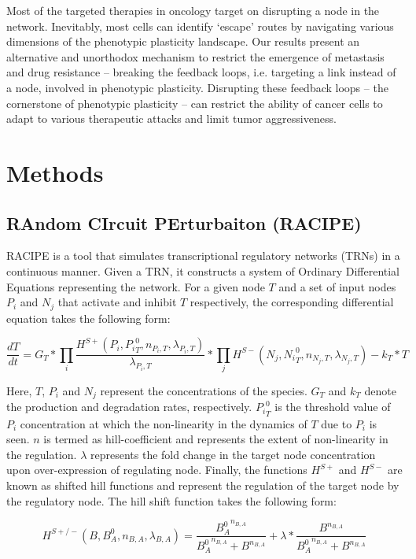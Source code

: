 \documentclass[preprint,review,12pt]{elsarticle}
\begin{document}
	Most of the targeted therapies in oncology target on disrupting a node in the network. Inevitably, most cells can identify ‘escape’ routes by navigating various dimensions of the phenotypic plasticity landscape. Our results present an alternative and unorthodox mechanism to restrict the emergence of metastasis and drug resistance -- breaking the feedback loops, i.e. targeting a link instead of a node, involved in phenotypic plasticity. Disrupting these feedback loops $–$ the cornerstone of phenotypic plasticity $–$ can restrict the ability of cancer cells to adapt to various therapeutic attacks and limit tumor aggressiveness.

	\newpage
	\section{Methods}
	\subsection{RAndom CIrcuit PErturbaiton (RACIPE)}
	RACIPE \cite{Huang2016,Huang2018} is a tool that simulates transcriptional regulatory networks (TRNs) in a continuous manner. Given a TRN, it constructs a system of Ordinary Differential Equations representing the network. \color{red}For a given node $T$ and a set of input nodes $P_i$ and $N_j$ that activate and inhibit $T$ respectively, the corresponding differential equation takes the following form:
	
	$$\frac{dT}{dt} = G_T * \prod_i \frac{H^{S+}(P_i, {P_i}^{0}_{T}, n_{P_i, T}, \lambda_{P_i, T})}{\lambda_{P_i, T}} * \prod_j H^{S-}(N_j, {N_i}^{0}_{T}, n_{N_j, T}, \lambda_{N_j, T}) - k_T*T$$ 
	
	Here, $T$, $P_i$ and $N_j$ represent the concentrations of the species. $G_T$ and $k_T$ denote the production and degradation rates, respectively. ${P_i}^{0}_{T}$ is the threshold value of $P_i$ concentration at which the non-linearity in the dynamics of $T$ due to $P_i$ is seen. $n$ is termed as hill-coefficient and represents the extent of non-linearity in the regulation. $\lambda$ represents the fold change in the target node concentration upon over-expression of regulating node. Finally, the functions $H^{S+}$ and $H^{S-}$ are known as shifted hill functions \cite{Lu2013} and represent the regulation of the target node by the regulatory node. The hill shift function takes the following form:
	
	$$H^{S+/-}(B, B^0_A, n_{B,A}, \lambda_{B,A}) = \frac{{B^0_A}^{n_{B,A}}}{{B^0_A}^{n_{B,A}} + B^{n_{B,A}}} + \lambda * \frac{B^{n_{B,A}}}{{B^0_A}^{n_{B,A}} + B^{n_{B,A}}}$$
	
\end{document}
